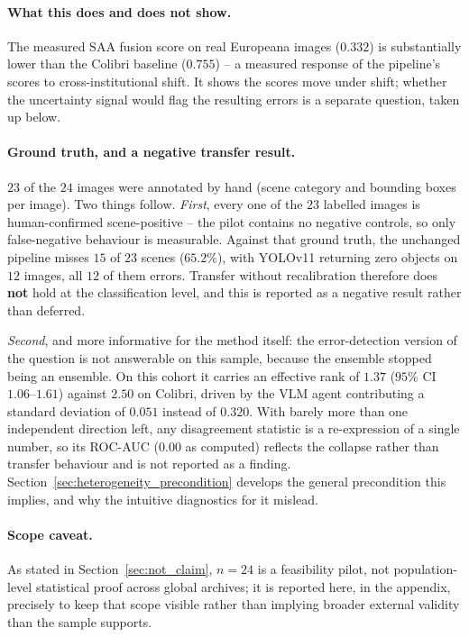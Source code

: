 \documentclass[12pt,a4paper]{report}
\begin{document}
\paragraph{What this does and does not show.} The measured SAA fusion score on real Europeana images ($0.332$) is substantially lower than the Colibri baseline ($0.755$) -- a measured response of the pipeline's scores to cross-institutional shift. It shows the scores move under shift; whether the uncertainty signal would flag the resulting errors is a separate question, taken up below.

\paragraph{Ground truth, and a negative transfer result.} $23$ of the $24$ images were annotated by hand (scene category and bounding boxes per image). Two things follow. \emph{First}, every one of the $23$ labelled images is human-confirmed scene-positive -- the pilot contains no negative controls, so only false-negative behaviour is measurable. Against that ground truth, the unchanged pipeline misses $15$ of $23$ scenes ($65.2\%$), with YOLOv11 returning zero objects on $12$ images, all $12$ of them errors. Transfer without recalibration therefore does \textbf{not} hold at the classification level, and this is reported as a negative result rather than deferred.

\emph{Second}, and more informative for the method itself: the error-detection version of the question is not answerable on this sample, because the ensemble stopped being an ensemble. On this cohort it carries an effective rank of $1.37$ ($95\%$ CI $1.06$--$1.61$) against $2.50$ on Colibri, driven by the VLM agent contributing a standard deviation of $0.051$ instead of $0.320$. With barely more than one independent direction left, any disagreement statistic is a re-expression of a single number, so its ROC-AUC ($0.00$ as computed) reflects the collapse rather than transfer behaviour and is not reported as a finding. Section~\ref{sec:heterogeneity_precondition} develops the general precondition this implies, and why the intuitive diagnostics for it mislead.

\paragraph{Scope caveat.} As stated in Section~\ref{sec:not_claim}, $n=24$ is a feasibility pilot, not population-level statistical proof across global archives; it is reported here, in the appendix, precisely to keep that scope visible rather than implying broader external validity than the sample supports.
\end{document}
